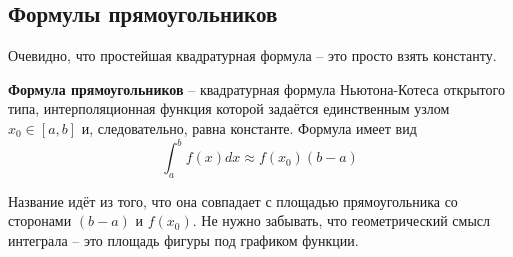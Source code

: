 \documentclass[../main.tex]{subfile}
\begin{document}
\subsection{Формулы прямоугольников}
Очевидно, что простейшая квадратурная формула -- это просто взять константу.

\begin{define}\label{eq:rectangle_formula}
	\textbf{Формула прямоугольников} -- квадратурная формула Ньютона-Котеса
	открытого типа, интерполяционная функция которой задаётся единственным
	узлом $x_0\in[a,b]$ и, следовательно, равна константе. Формула имеет вид
	\[\boxed{\int_{a}^{b}f(x)dx\approx f(x_0)(b-a)}\]
\end{define}

Название идёт из того, что она совпадает с площадью прямоугольника со сторонами
$(b-a)$ и $f(x_0)$. Не нужно забывать, что геометрический смысл интеграла -- это
площадь фигуры под графиком функции.
\end{document}
